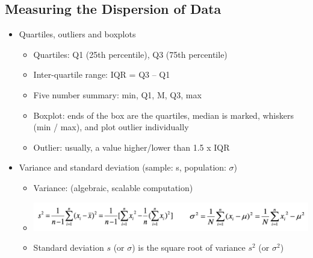 \documentclass[11pt]{article}
\theoremstyle{definition}
\begin{document}
\subsection{Measuring the Dispersion of Data}
\begin{itemize}
    \item Quartiles, outliers and boxplots
    \begin{itemize}
        \item Quartiles: Q1 (25th percentile), Q3 (75th percentile)
        \item Inter-quartile range: IQR = Q3 – Q1
        \item Five number summary: min, Q1, M, Q3, max
        \item Boxplot: ends of the box are the quartiles, median is marked, whiskers (min / max),
        and plot outlier individually
        \item Outlier: usually, a value higher/lower than 1.5 x IQR
    \end{itemize}
    \item Variance and standard deviation (sample: s, population: $\sigma$)
    \begin{itemize}
        \item Variance: (algebraic, scalable computation)
        \item \includegraphics[width=\textwidth - 51.46509pt]{7.png}
        \item Standard deviation $s$ (or $\sigma$) is the square root of variance $s^2$ (or $\sigma^2$)
    \end{itemize}
\end{itemize}
\end{document}
